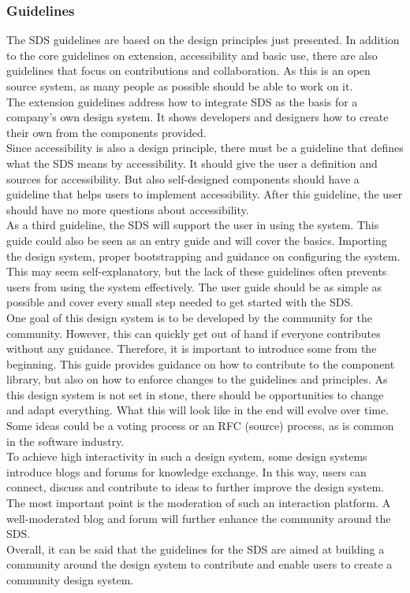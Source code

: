 \subsubsection*{Guidelines}
The SDS guidelines are based on the design principles just presented. In addition to the core guidelines on extension, accessibility and basic use, there are also guidelines that focus on contributions and collaboration. As this is an open source system, as many people as possible should be able to work on it. \\
The extension guidelines address how to integrate SDS as the basis for a company's own design system. It shows developers and designers how to create their own from the components provided. \\
Since accessibility is also a design principle, there must be a guideline that defines what the SDS means by accessibility. It should give the user a definition and sources for accessibility. But also self-designed components should have a guideline that helps users to implement accessibility. After this guideline, the user should have no more questions about accessibility. \\
As a third guideline, the SDS will support the user in using the system. This guide could also be seen as an entry guide and will cover the basics. Importing the design system, proper bootstrapping and guidance on configuring the system. This may seem self-explanatory, but the lack of these guidelines often prevents users from using the system effectively. The user guide should be as simple as possible and cover every small step needed to get started with the SDS. \\
One goal of this design system is to be developed by the community for the community. However, this can quickly get out of hand if everyone contributes without any guidance. Therefore, it is important to introduce some from the beginning. This guide provides guidance on how to contribute to the component library, but also on how to enforce changes to the guidelines and principles. As this design system is not set in stone, there should be opportunities to change and adapt everything. What this will look like in the end will evolve over time. Some ideas could be a voting process or an RFC (source) process, as is common in the software industry. \\
To achieve high interactivity in such a design system, some design systems introduce blogs and forums for knowledge exchange. In this way, users can connect, discuss and contribute to ideas to further improve the design system. The most important point is the moderation of such an interaction platform. A well-moderated blog and forum will further enhance the community around the SDS. \\
Overall, it can be said that the guidelines for the SDS are aimed at building a community around the design system to contribute and enable users to create a community design system. 

